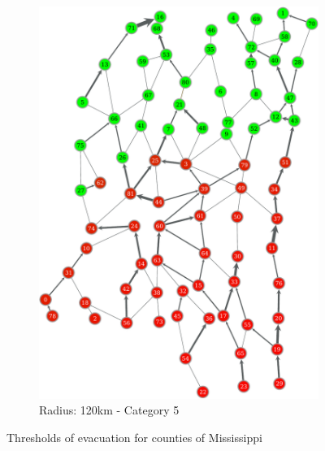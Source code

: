 \documentclass[titlepage]{article}
\begin{document}
\begin{figure}[H]
\begin{subfigure}[b]{0.3\textwidth}
        \includegraphics[width=\textwidth]{figures/right_120_5-crop.pdf}
        \caption{Radius: 120km - Category 5}
        \label{fig:pop_county60}
      \end{subfigure}
      \caption{Thresholds of evacuation for counties of Mississippi}
      \label{fig:thresholds}
    \end{figure}
\end{document}
